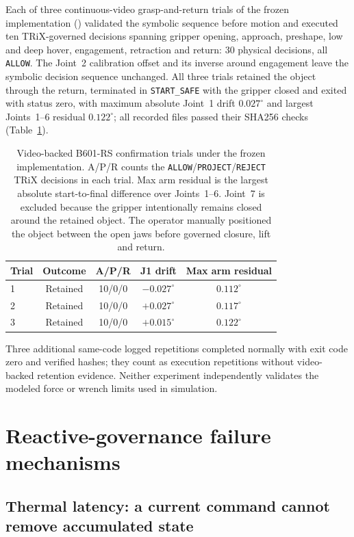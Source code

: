 \documentclass[10pt]{article}
\begin{document}
Each of three continuous-video grasp-and-return trials of the frozen
implementation () validated the symbolic sequence
before motion and executed ten TRiX-governed decisions spanning gripper opening, approach, preshape, low and deep hover, engagement,
retraction and return: 30 physical decisions, all \texttt{ALLOW}. The
Joint~2 calibration offset and its inverse around engagement leave the
symbolic decision sequence unchanged. All three trials
retained the object through the return, terminated in \texttt{START\_SAFE} with
the gripper closed and exited with status zero, with maximum absolute Joint~1 drift \(0.027^\circ\)
and largest Joints~1--6 residual \(0.122^\circ\); all recorded files passed their SHA256 checks
(Table~\ref{tab:b601-hardware}).

\begin{table}[H]
\centering
\small
\caption{Video-backed B601-RS confirmation trials under the frozen
implementation. A/P/R counts the
\texttt{ALLOW}/\texttt{PROJECT}/\texttt{REJECT} TRiX decisions in each trial. Max arm
residual is the largest absolute start-to-final difference over Joints~1--6.
Joint~7 is excluded because the gripper intentionally remains closed around
the retained object. The operator manually positioned the object between the
open jaws before governed closure, lift and return.}
\label{tab:b601-hardware}
\begin{tabular}{lcccc}
\toprule
Trial & Outcome & A/P/R & J1 drift & Max arm residual \\
\midrule
1 & Retained & 10/0/0 & \(-0.027^\circ\) & \(0.112^\circ\) \\
2 & Retained & 10/0/0 & \(+0.027^\circ\) & \(0.117^\circ\) \\
3 & Retained & 10/0/0 & \(+0.015^\circ\) & \(0.122^\circ\) \\
\bottomrule
\end{tabular}
\end{table}

Three additional same-code logged
repetitions completed normally with exit code zero and verified hashes; they count as execution repetitions without video-backed retention evidence. Neither
experiment independently validates the modeled force or wrench limits used in
simulation.


\section{Reactive-governance failure mechanisms}
\subsection{Thermal latency: a current command cannot remove accumulated state}
\end{document}
